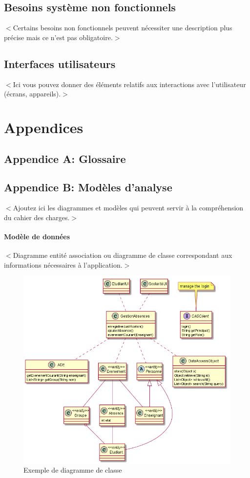 \documentclass{scrreprt}
\begin{document}
\section{Besoins système non fonctionnels}
$<$Certains besoins non fonctionnels peuvent nécessiter une description plus précise mais ce n'est pas obligatoire.$>$


\section{Interfaces utilisateurs}
$<$Ici vous pouvez donner des éléments relatifs aux interactions avec l'utilisateur (écrans, appareils).$>$

\chapter{Appendices}
\section{Appendice A: Glossaire}
\printglossaries

\section{Appendice B: Modèles d'analyse}
$<$Ajoutez ici les diagrammes et modèles qui peuvent servir à la compréhension du cahier des charges.$>$

\subsubsection{Modèle de données}
$<$Diagramme entité association ou diagramme de classe correspondant aux informations nécessaires à l'application.$>$

\begin{figure}
\includegraphics[width=\textwidth]{"AbsencesClasses"}
\caption{Exemple de diagramme de classe}
\end{figure}
\end{document}
